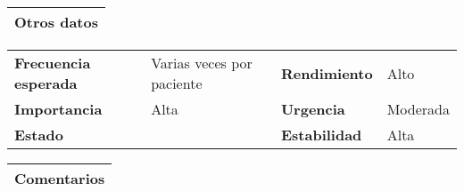 \documentclass[11pt,a4paper]{article}
\begin{document}
\begin{table}[H]
	\begin{tabularx}{\textwidth}{X}
		\textbf{Otros datos}\\ \hline
	\end{tabularx}
	\begin{tabularx}{\textwidth}{lXlX}
		\textbf{Frecuencia esperada} & Varias veces por paciente & \textbf{Rendimiento} & Alto\\
		\textbf{Importancia} & Alta & \textbf{Urgencia} & Moderada\\
		\textbf{Estado} &  & \textbf{Estabilidad} & Alta\\
	\end{tabularx}
	
	\begin{tabularx}{\textwidth}{X}
		\textbf{Comentarios}\\ \hline
	\end{tabularx}
\end{table}

\end{document}

